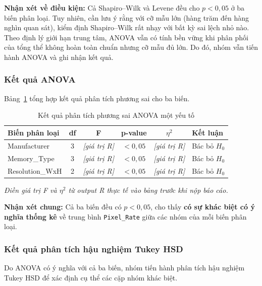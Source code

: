 \textbf{Nhận xét về điều kiện:} Cả Shapiro--Wilk và Levene đều cho $p < 0{,}05$
ở ba biến phân loại. Tuy nhiên, cần lưu ý rằng với cỡ mẫu lớn (hàng trăm đến
hàng nghìn quan sát), kiểm định Shapiro--Wilk rất nhạy với bất kỳ sai lệch nhỏ
nào. Theo định lý giới hạn trung tâm, ANOVA vẫn có tính bền vững khi phân phối
của tổng thể không hoàn toàn chuẩn nhưng cỡ mẫu đủ lớn. Do đó, nhóm vẫn tiến
hành ANOVA và ghi nhận kết quả.

\subsubsection{Kết quả ANOVA}

Bảng~\ref{tab:anova_result} tổng hợp kết quả phân tích phương sai cho ba biến.

\begin{table}[H]
  \centering
  \caption{Kết quả phân tích phương sai ANOVA một yếu tố}
  \label{tab:anova_result}
  \begin{tabular}{lccccl}
    \toprule
    \textbf{Biến phân loại} & \textbf{df} & \textbf{F} &
    \textbf{p-value} & \textbf{$\eta^2$} & \textbf{Kết luận} \\
    \midrule
    Manufacturer    & 3 & \textit{[giá trị R]} & $<0{,}05$ & \textit{[giá trị R]}
                    & Bác bỏ $H_0$ \\
    Memory\_Type    & 3 & \textit{[giá trị R]} & $<0{,}05$ & \textit{[giá trị R]}
                    & Bác bỏ $H_0$ \\
    Resolution\_WxH & 2 & \textit{[giá trị R]} & $<0{,}05$ & \textit{[giá trị R]}
                    & Bác bỏ $H_0$ \\
    \bottomrule
  \end{tabular}
  \par\smallskip
  \footnotesize\textit{Điền giá trị F và $\eta^2$ từ output R thực tế vào bảng trước khi nộp báo cáo.}
\end{table}

\textbf{Nhận xét chung:} Cả ba biến đều có $p < 0{,}05$, cho thấy \textbf{có sự
khác biệt có ý nghĩa thống kê} về trung bình \texttt{Pixel\_Rate} giữa các nhóm
của mỗi biến phân loại.

\subsubsection{Kết quả phân tích hậu nghiệm Tukey HSD}

Do ANOVA có ý nghĩa với cả ba biến, nhóm tiến hành phân tích hậu nghiệm Tukey
HSD để xác định cụ thể các cặp nhóm khác biệt.

